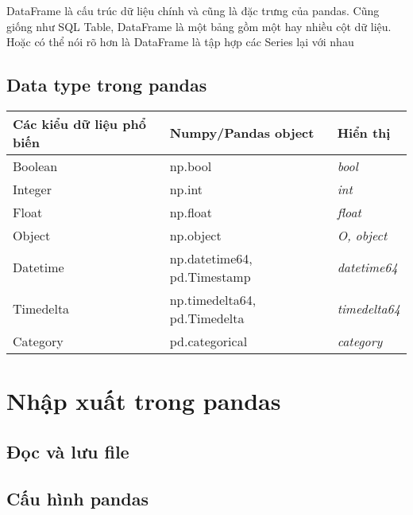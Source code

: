 \documentclass[
]{book}
\begin{document}
DataFrame là cấu trúc dữ liệu chính và cũng là đặc trưng của pandas. Cũng giống như SQL Table, DataFrame là một bảng gồm một hay nhiều cột dữ liệu. Hoặc có thể nói rõ hơn là DataFrame là tập hợp các Series lại với nhau

\hypertarget{data-type-trong-pandas}{%
\section{Data type trong pandas}\label{data-type-trong-pandas}}

\begin{longtable}[]{@{}
  >{\raggedright\arraybackslash}p{}
  >{\raggedright\arraybackslash}p{}
  >{\raggedright\arraybackslash}p{}@{}}
\toprule
Các kiểu dữ liệu
phổ biến & Numpy/Pandas
object & Hiển thị \\
\midrule
\endhead
Boolean & np.bool & \emph{bool} \\
Integer & np.int & \emph{int} \\
Float & np.float & \emph{float} \\
Object & np.object & \emph{O, object} \\
Datetime & np.datetime64,
pd.Timestamp & \emph{datetime64} \\
Timedelta & np.timedelta64,
pd.Timedelta & \emph{timedelta64} \\
Category & pd.categorical & \emph{category} \\
\bottomrule
\end{longtable}

\hypertarget{nhux1eadp-xuux1ea5t-trong-pandas}{%
\chapter{Nhập xuất trong pandas}\label{nhux1eadp-xuux1ea5t-trong-pandas}}

\hypertarget{ux111ux1ecdc-vuxe0-lux1b0u-file}{%
\section{Đọc và lưu file}\label{ux111ux1ecdc-vuxe0-lux1b0u-file}}

\hypertarget{cux1ea5u-huxecnh-pandas}{%
\section{Cấu hình pandas}\label{cux1ea5u-huxecnh-pandas}}
\end{document}
